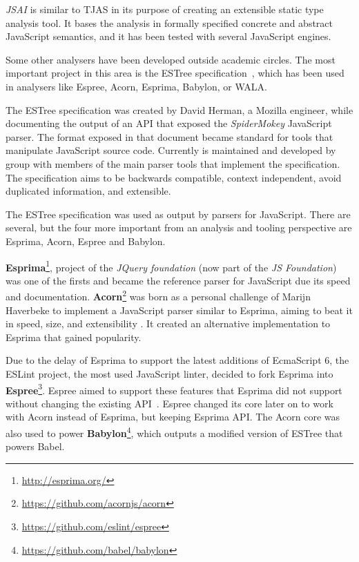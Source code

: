 \documentclass{uvamscse}
\begin{document}
\textit{JSAI} \cite{JSAI} is similar to TJAS in its purpose of creating an extensible static type analysis tool. It bases the analysis in formally specified concrete and abstract JavaScript semantics, and it has been tested with several JavaScript engines.

Some other analysers have been developed outside academic circles. The most important project in this area is the ESTree specification~\cite{ESTree}, which has been used in analysers like Espree, Acorn, Esprima, Babylon, or WALA.

The ESTree specification\cite{ESTree} was created by David Herman, a Mozilla engineer, while documenting the output of an API that exposed the \textit{SpiderMokey} JavaScript parser. The format exposed in that document became standard for tools that manipulate JavaScript source code. Currently is maintained and developed by group with members of the main parser tools that implement the specification. The specification aims to be backwards compatible, context independent, avoid duplicated information, and extensible.

The ESTree specification was used as output by parsers for JavaScript. There are several, but the four more important from an analysis and tooling perspective are Esprima, Acorn, Espree and Babylon.

\textbf{Esprima}\footnote{\url{http://esprima.org/}}, project of the \textit{JQuery foundation} (now part of the \textit{JS Foundation}) was one of the firsts and became the reference parser for JavaScript due its speed and documentation. \textbf{Acorn}\footnote{\url{https://github.com/acornjs/acorn}} was born as a personal challenge of Marijn Haverbeke to implement a JavaScript parser similar to Esprima, aiming to beat it in speed, size, and extensibility \cite{Acorn}. It created an alternative implementation to Esprima that gained popularity. 

Due to the delay of Esprima to support the latest additions of EcmaScript 6, the ESLint project, the most used JavaScript linter, decided to fork Esprima into \textbf{Espree}\footnote{\url{https://github.com/eslint/espree}}. Espree aimed to support these features that Esprima did not support without changing the existing API~\cite{Espree}. Espree changed its core later on to work with Acorn instead of Esprima, but keeping Esprima API. The Acorn core was also used to power \textbf{Babylon}\footnote{\url{https://github.com/babel/babylon}}, which outputs a modified version of ESTree that powers Babel. 
\end{document}

